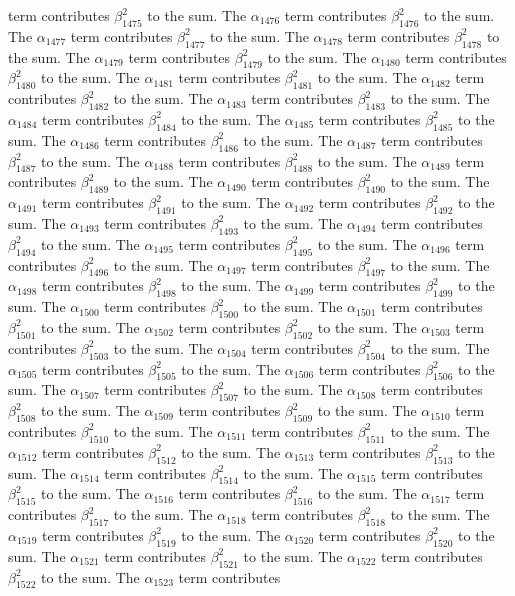 \begin{lemma}
term contributes $\beta_{1475}^{2}$ to the sum. The $\alpha_{1476}$ term contributes $\beta_{1476}^{2}$ to the sum. The $\alpha_{1477}$ term contributes $\beta_{1477}^{2}$ to the sum. The $\alpha_{1478}$ term contributes $\beta_{1478}^{2}$ to the sum. The $\alpha_{1479}$ term contributes $\beta_{1479}^{2}$ to the sum. The $\alpha_{1480}$ term contributes $\beta_{1480}^{2}$ to the sum. The $\alpha_{1481}$ term contributes $\beta_{1481}^{2}$ to the sum. The $\alpha_{1482}$ term contributes $\beta_{1482}^{2}$ to the sum. The $\alpha_{1483}$ term contributes $\beta_{1483}^{2}$ to the sum. The $\alpha_{1484}$ term contributes $\beta_{1484}^{2}$ to the sum. The $\alpha_{1485}$ term contributes $\beta_{1485}^{2}$ to the sum. The $\alpha_{1486}$ term contributes $\beta_{1486}^{2}$ to the sum. The $\alpha_{1487}$ term contributes $\beta_{1487}^{2}$ to the sum. The $\alpha_{1488}$ term contributes $\beta_{1488}^{2}$ to the sum. The $\alpha_{1489}$ term contributes $\beta_{1489}^{2}$ to the sum. The $\alpha_{1490}$ term contributes $\beta_{1490}^{2}$ to the sum. The $\alpha_{1491}$ term contributes $\beta_{1491}^{2}$ to the sum. The $\alpha_{1492}$ term contributes $\beta_{1492}^{2}$ to the sum. The $\alpha_{1493}$ term contributes $\beta_{1493}^{2}$ to the sum. The $\alpha_{1494}$ term contributes $\beta_{1494}^{2}$ to the sum. The $\alpha_{1495}$ term contributes $\beta_{1495}^{2}$ to the sum. The $\alpha_{1496}$ term contributes $\beta_{1496}^{2}$ to the sum. The $\alpha_{1497}$ term contributes $\beta_{1497}^{2}$ to the sum. The $\alpha_{1498}$ term contributes $\beta_{1498}^{2}$ to the sum. The $\alpha_{1499}$ term contributes $\beta_{1499}^{2}$ to the sum. The $\alpha_{1500}$ term contributes $\beta_{1500}^{2}$ to the sum. The $\alpha_{1501}$ term contributes $\beta_{1501}^{2}$ to the sum. The $\alpha_{1502}$ term contributes $\beta_{1502}^{2}$ to the sum. The $\alpha_{1503}$ term contributes $\beta_{1503}^{2}$ to the sum. The $\alpha_{1504}$ term contributes $\beta_{1504}^{2}$ to the sum. The $\alpha_{1505}$ term contributes $\beta_{1505}^{2}$ to the sum. The $\alpha_{1506}$ term contributes $\beta_{1506}^{2}$ to the sum. The $\alpha_{1507}$ term contributes $\beta_{1507}^{2}$ to the sum. The $\alpha_{1508}$ term contributes $\beta_{1508}^{2}$ to the sum. The $\alpha_{1509}$ term contributes $\beta_{1509}^{2}$ to the sum. The $\alpha_{1510}$ term contributes $\beta_{1510}^{2}$ to the sum. The $\alpha_{1511}$ term contributes $\beta_{1511}^{2}$ to the sum. The $\alpha_{1512}$ term contributes $\beta_{1512}^{2}$ to the sum. The $\alpha_{1513}$ term contributes $\beta_{1513}^{2}$ to the sum. The $\alpha_{1514}$ term contributes $\beta_{1514}^{2}$ to the sum. The $\alpha_{1515}$ term contributes $\beta_{1515}^{2}$ to the sum. The $\alpha_{1516}$ term contributes $\beta_{1516}^{2}$ to the sum. The $\alpha_{1517}$ term contributes $\beta_{1517}^{2}$ to the sum. The $\alpha_{1518}$ term contributes $\beta_{1518}^{2}$ to the sum. The $\alpha_{1519}$ term contributes $\beta_{1519}^{2}$ to the sum. The $\alpha_{1520}$ term contributes $\beta_{1520}^{2}$ to the sum. The $\alpha_{1521}$ term contributes $\beta_{1521}^{2}$ to the sum. The $\alpha_{1522}$ term contributes $\beta_{1522}^{2}$ to the sum. The $\alpha_{1523}$ term contributes 
\end{lemma}

